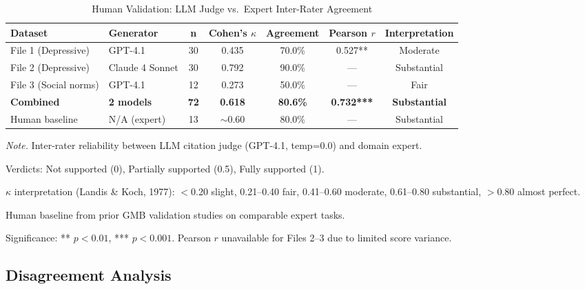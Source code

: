 \documentclass{article}
\begin{document}
\begin{table}[H]
\centering
\caption{Human Validation: LLM Judge vs.\ Expert Inter-Rater Agreement}
\label{tab:human_validation}
\begin{threeparttable}
\begin{tabular}{llccccc}
\toprule
\textbf{Dataset} & \textbf{Generator} & \textbf{n} & \textbf{Cohen's $\kappa$} & \textbf{Agreement} & \textbf{Pearson $r$} & \textbf{Interpretation} \\
\midrule
File 1 (Depressive) & GPT-4.1 & 30 & 0.435 & 70.0\% & 0.527** & Moderate \\
File 2 (Depressive) & Claude 4 Sonnet & 30 & 0.792 & 90.0\% & --- & Substantial \\
File 3 (Social norms) & GPT-4.1 & 12 & 0.273 & 50.0\% & --- & Fair \\
\midrule
\textbf{Combined} & \textbf{2 models} & \textbf{72} & \textbf{0.618} & \textbf{80.6\%} & \textbf{0.732***} & \textbf{Substantial} \\
\midrule
Human baseline & N/A (expert) & 13 & $\sim$0.60 & 80.0\% & --- & Substantial \\
\bottomrule
\end{tabular}
\begin{tablenotes}
\small
\item \textit{Note.} Inter-rater reliability between LLM citation judge (GPT-4.1, temp=0.0) and domain expert.
\item Verdicts: Not supported (0), Partially supported (0.5), Fully supported (1).
\item $\kappa$ interpretation (Landis \& Koch, 1977): $<$0.20 slight, 0.21--0.40 fair, 0.41--0.60 moderate, 0.61--0.80 substantial, $>$0.80 almost perfect.
\item Human baseline from prior GMB validation studies on comparable expert tasks.
\item Significance: ** $p<0.01$, *** $p<0.001$. Pearson $r$ unavailable for Files 2--3 due to limited score variance.
\end{tablenotes}
\end{threeparttable}
\end{table}

\subsection{Disagreement Analysis}
\end{document}
